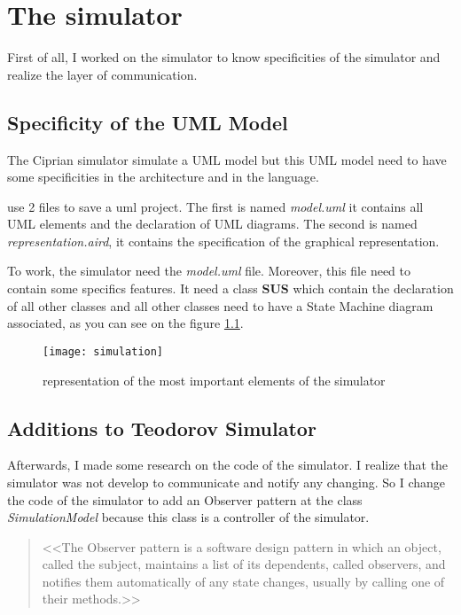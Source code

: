 
\chapter{The simulator}
\label{chap:simul}

First of all, I worked on the simulator to know specificities of the simulator and realize the layer of communication.

\section{Specificity of the UML Model}

The Ciprian simulator simulate a UML model but this UML model need to have some specificities in the architecture and in the language.

\umld use 2 files to save a uml project. The first is named \textit{model.uml} it contains all UML elements and the declaration of UML diagrams. The second is named \textit{representation.aird}, it contains the specification of the graphical representation.

To work, the simulator need the \textit{model.uml} file. Moreover, this file need to contain some specifics features. It need a class \textbf{SUS} which contain the declaration of all other classes and all other classes need to have a State Machine diagram associated, as you can see on the figure \ref{fig:simulateur}.

\begin{figure}[h!]
  \centering
  \texttt{[image: simulation]}
  \caption{representation of the most important elements of the simulator}
  \label{fig:simulateur}
\end{figure}

\section{Additions to Teodorov Simulator}

Afterwards, I made some research on the code of the simulator. I realize that the simulator was not develop to communicate and notify any changing. So I change the code of the simulator to add an Observer pattern at the class \textit{SimulationModel} because this class is a controller of the simulator.

\begin{quotation}
<<The Observer pattern is a software design pattern in which an object, called the subject, maintains a list of its dependents, called observers, and notifies them automatically of any state changes, usually by calling one of their methods.>> \cite{wiki_pattern}
\end{quotation}


